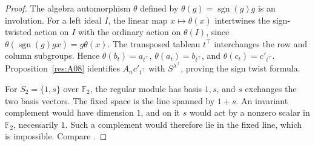 \begin{proof}
The algebra automorphism \(\theta\) defined by
\(\theta(g)=\operatorname{sgn}(g)g\) is an involution. For a left
ideal \(I\), the linear map \(x\mapsto\theta(x)\) intertwines the
sign-twisted action on \(I\) with the ordinary action on \(\theta(I)\),
since \(\theta(\operatorname{sgn}(g)gx)=g\theta(x)\).
The transposed tableau \(t^\top\) interchanges the row and column
subgroups. Hence \(\theta(b_t)=a_{t^\top}\),
\(\theta(a_t)=b_{t^\top}\), and \(\theta(c_t)=c'_{t^\top}\).
Proposition~\ref{res:A08} identifies \(A_n c'_{t^\top}\) with
\(S^{\lambda^\top}\), proving the sign twist formula.

For \(S_2=\{1,s\}\) over \(\mathbb F_2\), the regular module has
basis \(1,s\), and \(s\) exchanges the two basis vectors. The fixed
space is the line spanned by \(1+s\). An invariant complement would
have dimension \(1\), and on it \(s\) would act by a nonzero scalar
in \(\mathbb F_2\), necessarily \(1\). Such a complement would
therefore lie in the fixed line, which is impossible.
Compare \cite[\S3.1 and Problem 4.68(b)]{etingof}.
\end{proof}
